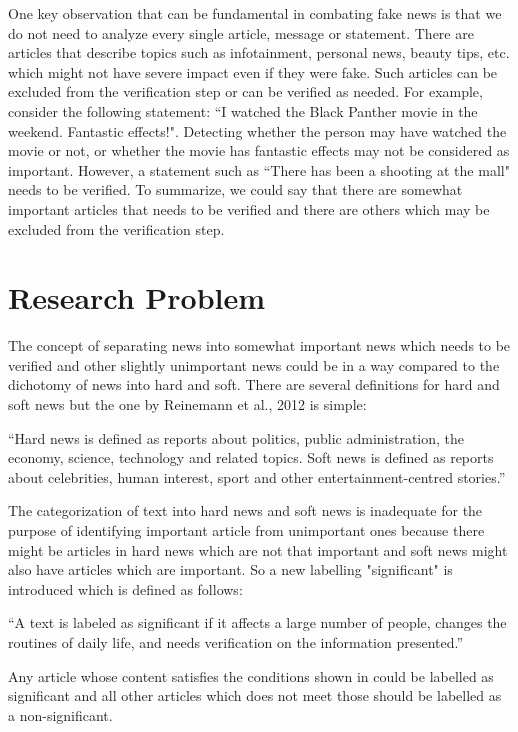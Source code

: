 One key observation that can be fundamental in combating fake news is that we do not need to analyze every single article, message or statement. There are articles that describe topics such as infotainment, personal news, beauty tips, etc. which might not have severe impact even if they were fake. Such articles can be excluded from the verification step or can be verified as needed. For example, consider the following statement: ``I watched the Black Panther movie in the weekend. Fantastic effects!". Detecting whether the person may have watched the movie or not, or whether the movie has fantastic effects may not be considered as important. However, a statement such as ``There has been a shooting at the mall" needs to be verified.
To summarize, we could say that there are somewhat important articles that needs to be verified and there are others which may be excluded from the verification step.

\section{Research Problem} \label{intro:research}
The concept of separating news into somewhat important news which needs to be verified and other slightly unimportant news could be in a way compared to the dichotomy of news into hard and soft. There are several definitions for hard and soft news \cite{reinemann2012hard, shoemaker2012news} but the one by Reinemann et al., 2012 is simple: 

\enquote{Hard news is defined as reports about politics, public administration, the economy, science, technology and related topics. Soft news is defined as reports about celebrities, human interest, sport and other entertainment-centred stories.}

The categorization of text into hard news and soft news is inadequate for the purpose of identifying important article from unimportant ones because there might be articles in hard news which are not that important and soft news might also have articles which are important. So a new labelling "significant" is introduced which is defined as follows:

\enquote{A text is labeled as significant if it affects a large number of people, changes the routines of daily life, and needs verification on the information presented.}

Any article whose content satisfies the conditions shown in  could be labelled as significant and all other articles which does not meet those should be labelled as a non-significant.


